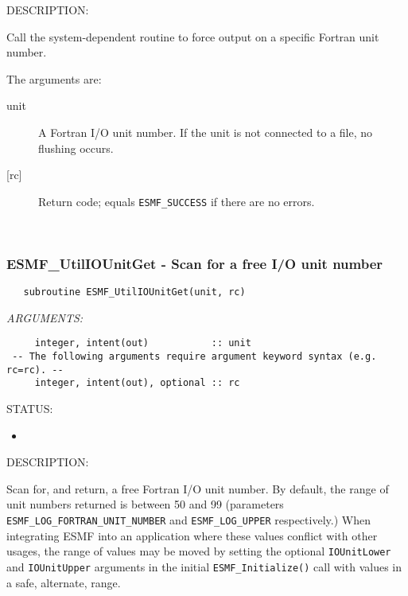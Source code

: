 {\sf DESCRIPTION:\\ }


     Call the system-dependent routine to force output on a specific
     Fortran unit number.
  
       The arguments are:
       \begin{description}
       \item[unit]
         A Fortran I/O unit number.  If the unit is not connected to a file,
         no flushing occurs.
       \item[{[rc]}]
         Return code; equals {\tt ESMF\_SUCCESS} if there are no errors.
       \end{description} 
 
\mbox{}\hrulefill\ 
 
\subsubsection [ESMF\_UtilIOUnitGet] {ESMF\_UtilIOUnitGet - Scan for a free I/O unit number}


  
\begin{verbatim}   subroutine ESMF_UtilIOUnitGet(unit, rc)\end{verbatim}{\em ARGUMENTS:}
\begin{verbatim}     integer, intent(out)           :: unit
 -- The following arguments require argument keyword syntax (e.g. rc=rc). --
     integer, intent(out), optional :: rc\end{verbatim}
{\sf STATUS:}
   \begin{itemize}
   \item{}
   \end{itemize}
  
{\sf DESCRIPTION:\\ }


     Scan for, and return, a free Fortran I/O unit number.
     By default, the range of unit numbers returned is between 50 and 99
     (parameters {\tt ESMF\_LOG\_FORTRAN\_UNIT\_NUMBER} and {\tt ESMF\_LOG\_UPPER}
     respectively.) When integrating ESMF into an application where these values
     conflict with other usages, the range of values may be moved by setting the
     optional {\tt IOUnitLower} and {\tt IOUnitUpper} arguments in the initial
     {\tt ESMF\_Initialize()} call with values in a safe, alternate, range.
  
